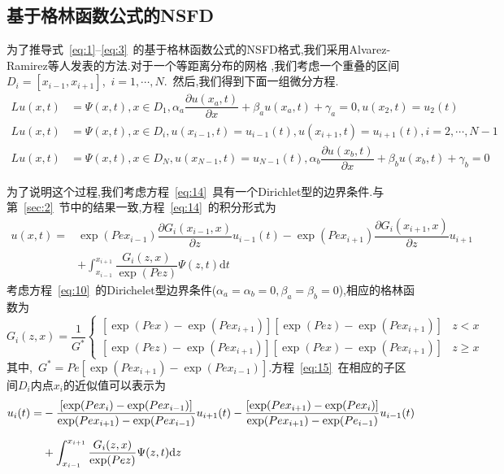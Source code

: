 \documentclass[a4paper,cs4size,adobefonts,cm-default,no-math]{ctexart}
\newcommand{\dif}{\mathrm{d}}
\begin{document}
\subsection{基于格林函数公式的NSFD}
为了推导式~\ref{eq:1}--\ref{eq:3}~的基于格林函数公式的NSFD格式,我们采用Alvarez-Ramirez等人发表的方法.对于一个等距离分布的网格
,我们考虑一个重叠的区间$D_i=[x_{i-1},x_{i+1}]$,~$i=1,\cdots,N$.~然后,我们得到下面一组微分方程.
\begin{equation}\label{eq:14}
 \begin{aligned}
  Lu(x,t)&=\Psi(x,t),x\in D_1,\alpha_a\dfrac{\partial u(x_a,t)}{\partial x}+\beta_a u(x_a,t)+\gamma_a=0,u(x_2,t)=u_2(t)\\
  Lu(x,t)&=\Psi(x,t),x\in D_i,u(x_{i-1},t)=u_{i-1}(t),u(x_{i+1},t)=u_{i+1}(t),i=2,\cdots,N-1 \\
  Lu(x,t)&=\Psi(x,t),x\in D_N,u(x_{N-1},t)=u_{N-1}(t),\alpha_b\dfrac{\partial u(x_b,t)}{\partial x}
          +\beta_b u(x_b,t)+\gamma_b=0
 \end{aligned}
\end{equation}\par
为了说明这个过程,我们考虑方程~\ref{eq:14}~具有一个Dirichlet型的边界条件.与第~\ref{sec:2}~节中的结果一致,方程~\ref{eq:14}~的积分形式为
\begin{equation}\label{eq:15}
\begin{split}
 u(x,t)=&\exp(Pex_{i-1})\dfrac{\partial G_i(x_{i-1},x)}{\partial z}u_{i-1}(t)-\exp(Pex_{i+1})\dfrac{\partial
 G_i(x_{i+1},x)}{\partial z}u_{i+1}\\[0.6em]
 &+\int_{x_{i-1}}^{x_{i+1}}\dfrac{G_i(z,x)}{\exp(Pez)}\Psi(z,t)\dif t
\end{split}
\end{equation}
考虑方程~\ref{eq:10}~的Dirichelet型边界条件($\alpha_a=\alpha_b=0,\beta_a=\beta_b=0$),相应的格林函数为
\begin{equation}
 G_i(z,x)=\dfrac{1}{G^*}
 \begin{cases}
  [\exp(Pex)-\exp(Pex_{i+1})][\exp(Pez)-\exp(Pex_{i+1})] & z<x \\
  [\exp(Pez)-\exp(Pex_{i+1})][\exp(Pex)-\exp(Pex_{i+1})] & z\geq x 
 \end{cases}
\end{equation}
其中,~$G^*=Pe[\exp(Pex_{i+1})-\exp(Pex_{i-1})]$.方程~\ref{eq:15}~在相应的子区间$D_i$内点$x_i$的近似值可以表示为
\begin{equation}\label{eq:17}
\begin{split}
 u_i(t)=&-\dfrac{[\exp(Pex_i)-\exp(Pex_{i-1})]}{\exp(Pex_{i+1})-\exp(Pex_{i-1})}u_{i+1}(t)
        -\dfrac{[\exp(Pex_{i+1})-\exp(Pex_i)]}{\exp(Pex_{i+1})-\exp(Pe_{i-1})}u_{i-1}(t) \\[0.5\baselineskip]
        &+\int_{x_{i-1}}^{x_{i+1}}\dfrac{G_i(z,x)}{\exp(Pez)}\Psi(z,t)\dif z
\end{split}
\end{equation}\par
\end{document}
